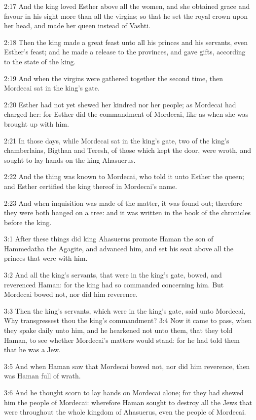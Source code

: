2:17 And the king loved Esther above all the women, and she obtained
grace and favour in his sight more than all the virgins; so that he
set the royal crown upon her head, and made her queen instead of
Vashti.

2:18 Then the king made a great feast unto all his princes and his
servants, even Esther's feast; and he made a release to the provinces,
and gave gifts, according to the state of the king.

2:19 And when the virgins were gathered together the second time, then
Mordecai sat in the king's gate.

2:20 Esther had not yet shewed her kindred nor her people; as Mordecai
had charged her: for Esther did the commandment of Mordecai, like as
when she was brought up with him.

2:21 In those days, while Mordecai sat in the king's gate, two of the
king's chamberlains, Bigthan and Teresh, of those which kept the door,
were wroth, and sought to lay hands on the king Ahasuerus.

2:22 And the thing was known to Mordecai, who told it unto Esther the
queen; and Esther certified the king thereof in Mordecai's name.

2:23 And when inquisition was made of the matter, it was found out;
therefore they were both hanged on a tree: and it was written in the
book of the chronicles before the king.

3:1 After these things did king Ahasuerus promote Haman the son of
Hammedatha the Agagite, and advanced him, and set his seat above all
the princes that were with him.

3:2 And all the king's servants, that were in the king's gate, bowed,
and reverenced Haman: for the king had so commanded concerning him.
But Mordecai bowed not, nor did him reverence.

3:3 Then the king's servants, which were in the king's gate, said unto
Mordecai, Why transgressest thou the king's commandment?  3:4 Now it
came to pass, when they spake daily unto him, and he hearkened not
unto them, that they told Haman, to see whether Mordecai's matters
would stand: for he had told them that he was a Jew.

3:5 And when Haman saw that Mordecai bowed not, nor did him reverence,
then was Haman full of wrath.

3:6 And he thought scorn to lay hands on Mordecai alone; for they had
shewed him the people of Mordecai: wherefore Haman sought to destroy
all the Jews that were throughout the whole kingdom of Ahasuerus, even
the people of Mordecai.

